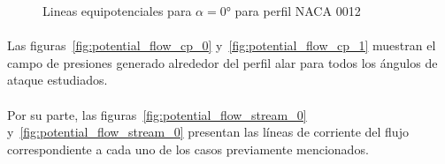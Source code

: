 \documentclass[letterpaper, openright, 12pt]{book}
\begin{document}
    \begin{figure}[htbp!]
        \centering
        \caption{Lineas equipotenciales para $\alpha = 0\si{\degree}$ para
          perfil NACA 0012}
        \label{fig:potential_flow_potential}
    \end{figure}

    \paragraph*{}
    Las figuras~\ref{fig:potential_flow_cp_0} y~\ref{fig:potential_flow_cp_1}
    muestran el campo de presiones generado alrededor del perfil alar para todos
    los ángulos de ataque estudiados.

    \paragraph*{}
    Por su parte, las figuras~\ref{fig:potential_flow_stream_0}
    y~\ref{fig:potential_flow_stream_0} presentan las líneas de corriente del
    flujo correspondiente a cada uno de los casos previamente mencionados.
\end{document}
